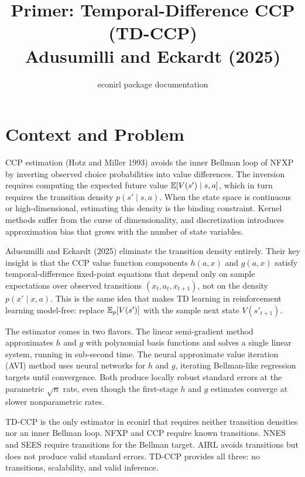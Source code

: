 \documentclass[11pt]{article}
\title{Primer: Temporal-Difference CCP (TD-CCP)\\[4pt]
\large Adusumilli and Eckardt (2025)}
\author{econirl package documentation}
\date{}
\begin{document}
\maketitle

\section{Context and Problem}

CCP estimation (Hotz and Miller 1993) avoids the inner Bellman loop of NFXP by inverting observed choice probabilities into value differences.
The inversion requires computing the expected future value $\mathbb{E}[V(s') \mid s,a]$, which in turn requires the transition density $p(s' \mid s,a)$.
When the state space is continuous or high-dimensional, estimating this density is the binding constraint.
Kernel methods suffer from the curse of dimensionality, and discretization introduces approximation bias that grows with the number of state variables.

Adusumilli and Eckardt (2025) eliminate the transition density entirely.
Their key insight is that the CCP value function components $h(a,x)$ and $g(a,x)$ satisfy temporal-difference fixed-point equations that depend only on sample expectations over observed transitions $(x_t, a_t, x_{t+1})$, not on the density $p(x' \mid x,a)$.
This is the same idea that makes TD learning in reinforcement learning model-free: replace $\mathbb{E}_{p}[V(s')]$ with the sample next state $V(s'_{t+1})$.

The estimator comes in two flavors.
The linear semi-gradient method approximates $h$ and $g$ with polynomial basis functions and solves a single linear system, running in sub-second time.
The neural approximate value iteration (AVI) method uses neural networks for $h$ and $g$, iterating Bellman-like regression targets until convergence.
Both produce locally robust standard errors at the parametric $\sqrt{n}$ rate, even though the first-stage $h$ and $g$ estimates converge at slower nonparametric rates.

TD-CCP is the only estimator in econirl that requires neither transition densities nor an inner Bellman loop.
NFXP and CCP require known transitions.
NNES and SEES require transitions for the Bellman target.
AIRL avoids transitions but does not produce valid standard errors.
TD-CCP provides all three: no transitions, scalability, and valid inference.
\end{document}
